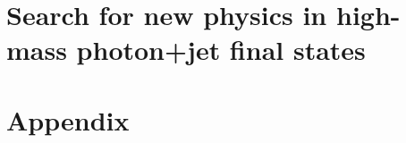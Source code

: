 \documentclass[a4paper,11pt,oneside]{memoir}
\begin{document}
\FloatBarrier
\part{Search for new physics in high-mass photon+jet final states}
\label{part:search}







\FloatBarrier



















\appendix
\part*{Appendix}



% 
% 
\backmatter














\clearpage


% 
%
%
% 
% 
%
% 







\end{document}
